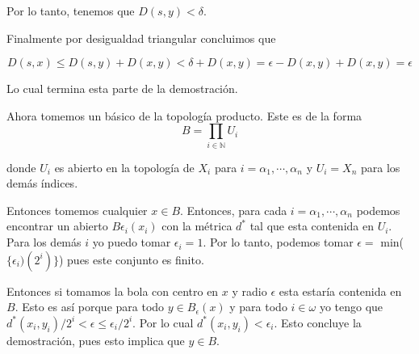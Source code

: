 \documentclass[letter,twoside,12pt]{article}
\begin{document}
\begin{enumerate}
Por lo tanto, tenemos que $ D(s,y)<\delta $.

Finalmente por desigualdad triangular concluimos que

\begin{equation}
D(s,x) \leq D(s,y)+D(x,y) < \delta+D(x,y)=\epsilon-D(x,y)+D(x,y) =\epsilon\nonumber
\end{equation}

Lo cual termina esta parte de la demostración.

Ahora tomemos un básico de la topología producto. Este es de la forma
\begin{equation}
B=\prod_{i \in \mathbb{N}} U_i \nonumber
\end{equation}

donde $ U_i $ es abierto en la topología de $ X_i $ para $ i = \alpha_1, \cdots, \alpha_n $ y $U_i=X_n$ para los demás índices.

Entonces tomemos cualquier $ x \in B $. Entonces, para cada $ i = \alpha_1, \cdots, \alpha_n $ podemos encontrar un abierto $B\epsilon_i(x_i)$ con la métrica $d^*$ tal que esta contenida en $ U_i $. Para los demás $ i $ yo puedo tomar $ \epsilon_i=1 $. Por lo tanto, podemos tomar $\epsilon =$ min($ \{\epsilon_i)(2^i)\}$) pues este conjunto es finito.

Entonces si tomamos la bola con centro en $ x $ y radio $ \epsilon $ esta estaría contenida en $B$. Esto es así porque para todo $ y \in B_\epsilon(x) $ y para todo $ i \in \omega $ yo tengo que $d^*(x_i,y_i)/2^i<\epsilon\leq \epsilon_i/2^i$. Por lo cual $d^*(x_i,y_i)<\epsilon_i$. Esto concluye la demostración, pues esto implica que $y \in B$.

\end{enumerate}
\end{document}
